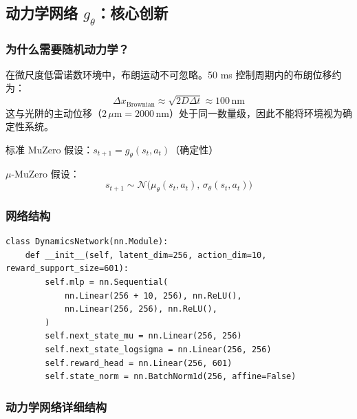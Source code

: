 \documentclass[UTF8, a4paper]{ctexart}
\begin{document}
\subsection{动力学网络 $g_\theta$：核心创新}

\subsubsection{为什么需要随机动力学？}

在微尺度低雷诺数环境中，布朗运动不可忽略。50 ms 控制周期内的布朗位移约为：
\begin{equation}
\Delta x_{\text{Brownian}} \approx \sqrt{2D\Delta t} \approx 100\,\text{nm}
\end{equation}
这与光阱的主动位移（$2\,\mu\text{m} = 2000\,\text{nm}$）处于同一数量级，因此不能将环境视为确定性系统。

标准 MuZero 假设：$s_{t+1} = g_\theta(s_t, a_t)$（确定性）

$\mu$-MuZero 假设：
\begin{equation}
\boxed{s_{t+1} \sim \mathcal{N}\big(\mu_\theta(s_t, a_t), \, \sigma_\theta(s_t, a_t)\big)}
\end{equation}

\subsubsection{网络结构}

\begin{lstlisting}
class DynamicsNetwork(nn.Module):
    def __init__(self, latent_dim=256, action_dim=10, reward_support_size=601):
        self.mlp = nn.Sequential(
            nn.Linear(256 + 10, 256), nn.ReLU(),
            nn.Linear(256, 256), nn.ReLU(),
        )
        self.next_state_mu = nn.Linear(256, 256)
        self.next_state_logsigma = nn.Linear(256, 256)
        self.reward_head = nn.Linear(256, 601)
        self.state_norm = nn.BatchNorm1d(256, affine=False)
\end{lstlisting}

\subsubsection{动力学网络详细结构}
\end{document}
